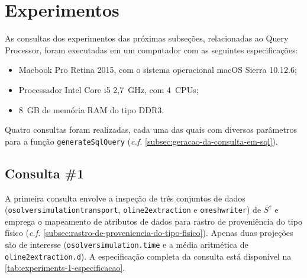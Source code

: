 
\section{Experimentos}

As consultas dos experimentos das próximas subseções, relacionadas ao Query Processor, foram executadas em um computador com as seguintes especificações:

\begin{itemize}
	\item Macbook Pro Retina 2015, com o sistema operacional macOS Sierra 10.12.6;
    \item Processador Intel Core i5 2,7~GHz, com 4~CPUs;
    \item 8~GB de memória RAM do tipo DDR3.
\end{itemize}

Quatro consultas foram realizadas, cada uma das quais com diversos parâmetros para a função \texttt{generateSqlQuery} (\textit{c.f.} \autoref{subsec:geracao-da-consulta-em-sql}).

\subsection{Consulta \#1}

A primeira consulta envolve a inspeção de três conjuntos de dados (\texttt{osolversimulationtransport}, \texttt{oline2extraction} e \texttt{omeshwriter}) de \(S^{\dagger}\) e emprega o mapeamento de atributos de dados para rastro de proveniência do tipo físico (\textit{c.f.} \autoref{subsec:rastro-de-proveniencia-do-tipo-fisico}). Apenas duas projeções são de interesse (\texttt{osolversimulation.time} e a média aritmética de \texttt{oline2extraction.d}). A especificação completa da consulta está disponível na \autoref{tab:experiments-1-especificacao}.

